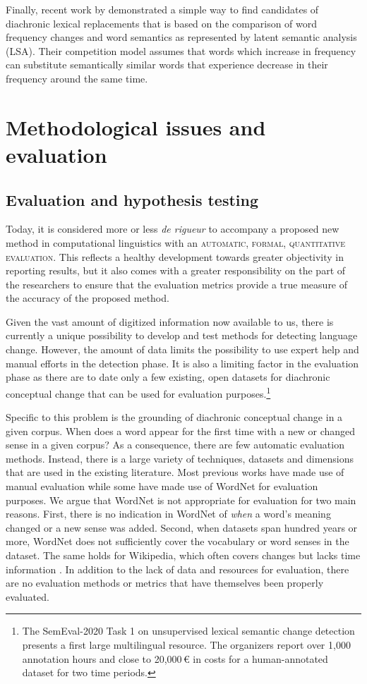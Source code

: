 \documentclass[output=paper]{langsci/langscibook}
\begin{document}
Finally, recent work by \citet{karjus2020communicative} demonstrated a simple way to find candidates of diachronic lexical replacements that is based on the comparison of word frequency changes and word semantics as represented by latent semantic analysis (LSA). Their competition model assumes that words which increase in frequency can substitute semantically similar words that experience decrease in their frequency around the same time. 


\section{Methodological issues and evaluation}\label{sec:method}
\subsection{Evaluation and hypothesis testing}\label{sec:evaltesting}
Today, it is considered more or less \emph{de rigueur} to accompany a proposed new method in computational linguistics with an \textsc{automatic, formal, quantitative evaluation}. This reflects a healthy development towards greater objectivity in reporting results, but it also comes with a greater responsibility on the part of the researchers to ensure that the evaluation metrics provide a true measure of the accuracy of the proposed method. 

Given the vast amount of digitized information now available to us, there is currently a unique possibility to develop and test methods for detecting language change. However, the amount of data limits the possibility to use expert help and manual efforts in the detection phase. It is also a limiting factor in the evaluation phase as there are to date only a few existing, open datasets for diachronic conceptual change that can be used for evaluation purposes.\footnote{The SemEval-2020 Task 1 on unsupervised lexical semantic change detection presents a first large multilingual resource. The organizers report over 1,000 annotation hours and close to 20,000\,€ in costs for a human-annotated dataset for two time periods.} 

Specific to this problem is the grounding of diachronic conceptual change in a given corpus. When does a word appear for the first time with a new or changed sense in a given corpus? As a consequence, there are few automatic evaluation methods. Instead, there is a large variety of techniques, datasets and dimensions that are used in the existing literature. Most previous works have made use of manual evaluation while some have made use of WordNet for evaluation purposes. We argue that WordNet is not appropriate for evaluation for two main reasons. First, there is no indication in WordNet of \emph{when} a word's meaning changed or a new sense was added. Second, when datasets span hundred years or more, WordNet does not sufficiently cover the vocabulary or word senses in the dataset. The same holds for Wikipedia, which often covers changes but lacks time information \citep{holzmann2014insights}. In addition to the lack of data and resources for evaluation, there are no evaluation methods or metrics that have themselves been properly evaluated. 
\end{document}
